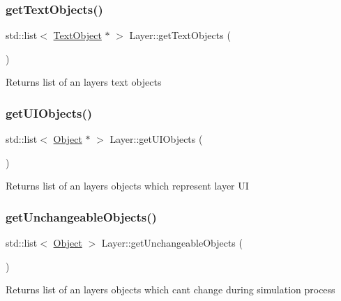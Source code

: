 \subsubsection{\texorpdfstring{get\+Text\+Objects()}{getTextObjects()}}
{\footnotesize\ttfamily std\+::list$<$ \hyperlink{class_text_object}{Text\+Object} $\ast$ $>$ Layer\+::get\+Text\+Objects (\begin{DoxyParamCaption}{ }\end{DoxyParamCaption})}

\begin{DoxyReturn}{Returns}
list of an layers text objects 
\end{DoxyReturn}
\mbox{\label{class_layer_a2aebff84a5f25f25d56d3886c8c3a4b1}} 
\subsubsection{\texorpdfstring{get\+U\+I\+Objects()}{getUIObjects()}}
{\footnotesize\ttfamily std\+::list$<$ \hyperlink{class_object}{Object} $\ast$ $>$ Layer\+::get\+U\+I\+Objects (\begin{DoxyParamCaption}{ }\end{DoxyParamCaption})}

\begin{DoxyReturn}{Returns}
list of an layers objects which represent layer UI 
\end{DoxyReturn}
\mbox{\label{class_layer_a88251ea7cc836a16dbca1e134c5a5ee5}} 
\subsubsection{\texorpdfstring{get\+Unchangeable\+Objects()}{getUnchangeableObjects()}}
{\footnotesize\ttfamily std\+::list$<$ \hyperlink{class_object}{Object} $>$ Layer\+::get\+Unchangeable\+Objects (\begin{DoxyParamCaption}{ }\end{DoxyParamCaption})}

\begin{DoxyReturn}{Returns}
list of an layers objects which can\textquotesingle{}t change during simulation process 
\end{DoxyReturn}
\mbox{\label{class_layer_a952ad194d28fe6999b85bd3d9d28ee31}} 

